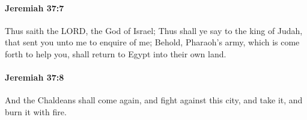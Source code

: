 		\paragraph{Jeremiah 37:7} %
			\label{JEREMIAH-37-7}

			Thus saith the LORD, the God of Israel; Thus shall ye say to the king of Judah, that sent you unto me to enquire of me; Behold, Pharaoh’s army, which is come forth to help you, shall return to Egypt into their own land.


		\paragraph{Jeremiah 37:8} %
			\label{JEREMIAH-37-8}

			And the Chaldeans shall come again, and fight against this city, and take it, and burn it with fire.


